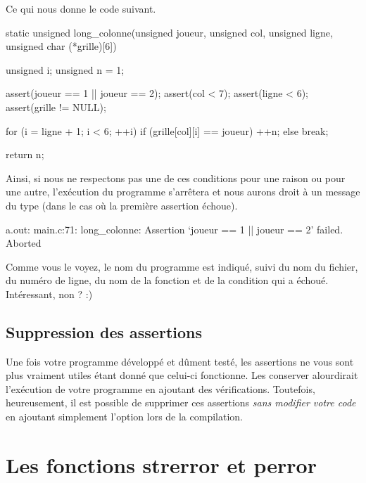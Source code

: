 Ce qui nous donne le code suivant.

\begin{C}
static unsigned long_colonne(unsigned joueur, unsigned col, unsigned ligne, unsigned char (*grille)[6])
{
    unsigned i;
    unsigned n = 1;

    assert(joueur == 1 || joueur == 2);
    assert(col < 7);
    assert(ligne < 6);
    assert(grille != NULL);

    for (i = ligne + 1; i < 6; ++i)
    {
        if (grille[col][i] == joueur)
            ++n;
        else
            break;
    }

    return n;
}
\end{C}

Ainsi, si nous ne respectons pas une de ces conditions pour une raison
ou pour une autre, l'exécution du programme s'arrêtera et nous aurons
droit à un message du type (dans le cas où la première assertion
échoue).

\begin{C}
a.out: main.c:71: long_colonne: Assertion `joueur == 1 || joueur == 2' failed.
Aborted
\end{C}

Comme vous le voyez, le nom du programme est indiqué, suivi du nom du
fichier, du numéro de ligne, du nom de la fonction et de la condition
qui a échoué. Intéressant, non ? :)

\subsection{Suppression des assertions}
\label{suppression-des-assertions}

Une fois votre programme développé et dûment testé, les assertions ne
vous sont plus vraiment utiles étant donné que celui-ci fonctionne. Les
conserver alourdirait l'exécution de votre programme en ajoutant des
vérifications. Toutefois, heureusement, il est possible de supprimer ces
assertions \emph{sans modifier votre code} en ajoutant simplement
l'option  lors de la compilation.



\section{Les fonctions strerror et perror}
\label{les-fonctions-strerror-et-perror}

